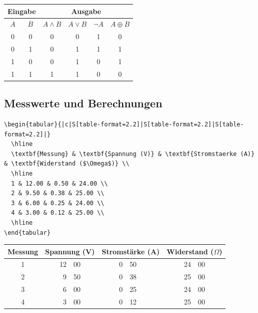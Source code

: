 \documentclass[12pt,a4paper]{article}
\begin{document}
\begin{ausgabe}
\begin{center}
\begin{tabular}{|c|c||c|c|c|c|}
  \hline
  \multicolumn{2}{|c||}{Eingabe} & \multicolumn{4}{c|}{Ausgabe} \\
  \hline
  $A$ & $B$ & $A \land B$ & $A \lor B$ & $\neg A$ & $A \oplus B$ \\
  \hline
  0 & 0 & 0 & 0 & 1 & 0 \\
  0 & 1 & 0 & 1 & 1 & 1 \\
  1 & 0 & 0 & 1 & 0 & 1 \\
  1 & 1 & 1 & 1 & 0 & 0 \\
  \hline
\end{tabular}
\end{center}
\end{ausgabe}

\subsection{Messwerte und Berechnungen}

\begin{lstlisting}[style=latex]
\begin{tabular}{|c|S[table-format=2.2]|S[table-format=2.2]|S[table-format=2.2]|}
  \hline
  \textbf{Messung} & \textbf{Spannung (V)} & \textbf{Stromstaerke (A)} & \textbf{Widerstand ($\Omega$)} \\
  \hline
  1 & 12.00 & 0.50 & 24.00 \\
  2 & 9.50 & 0.38 & 25.00 \\
  3 & 6.00 & 0.25 & 24.00 \\
  4 & 3.00 & 0.12 & 25.00 \\
  \hline
\end{tabular}
\end{lstlisting}

\begin{ausgabe}
\begin{center}
\begin{tabular}{|c|r@{.}l|r@{.}l|r@{.}l|}
  \hline
  \textbf{Messung} & \multicolumn{2}{c|}{\textbf{Spannung (V)}} & \multicolumn{2}{c|}{\textbf{Stromstärke (A)}} & \multicolumn{2}{c|}{\textbf{Widerstand ($\Omega$)}} \\
  \hline
  1 & 12&00 & 0&50 & 24&00 \\
  2 & 9&50 & 0&38 & 25&00 \\
  3 & 6&00 & 0&25 & 24&00 \\
  4 & 3&00 & 0&12 & 25&00 \\
  \hline
\end{tabular}
\end{center}
\end{ausgabe}
\end{document}
